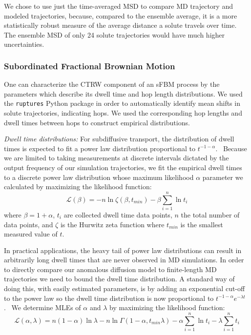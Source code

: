 \documentclass[aps,pre,preprint,groupedaddress,longbibliography]{revtex4-2}
\begin{document}
  We chose to use just the time-averaged MSD to compare MD trajectory and modeled
  trajectories, because, compared to the ensemble average, it is a more 
  statistically robust measure of the average distance a solute travels over time.
  The ensemble MSD of only 24 solute trajectories would have much higher uncertainties.
  
  \subsubsection{Subordinated Fractional Brownian Motion}\label{method:sfbm}

  One can characterize the CTRW component of an sFBM process by the parameters which describe
  its dwell time and hop length distributions. We used the \texttt{ruptures} Python
  package in order to automatically identify mean shifts in solute trajectories, 
  indicating hops.\cite{truong_ruptures:_2018} We used the corresponding hop lengths
  and dwell times between hops to construct empirical distributions.
  
  \textit{Dwell time distributions:} For subdiffusive transport, the distribution 
  of dwell times is expected to fit a power law distribution 
  proportional to $t^{-1-\alpha}$.~\cite{meroz_toolbox_2015}
  Because we are limited to taking measurements at discrete intervals dictated by the output 
  frequency of our simulation trajectories, we fit the empirical dwell times
  to a discrete power law distribution whose maximum likelihood $\alpha$ 
  parameter we calculated by maximizing the likelihood function: 
  \begin{equation}
	\mathcal{L}(\beta) = -n\ln \zeta(\beta, t_{min}) -
	\beta\sum_{i=1}^{n} \ln t_i 
  \label{eqn:powerlaw_likelihood}
  \end{equation}
  where $\beta = 1 + \alpha$, $t_i$ are collected dwell time data points,
  $n$ the total number of data points, and $\zeta$ is the Hurwitz zeta function
  where $t_{min}$ is the smallest measured value of	$t$.~\cite{clauset_power-law_2009}
  
  In practical applications, the heavy tail of power law distributions can result in 
  arbitrarily long dwell times that are never observed in MD simulations. 
  In order to directly compare our anomalous diffusion model to finite-length MD 
  trajectories we need to bound the dwell time distribution. A standard way of 
  doing this, with easily estimated parameters, is by adding an exponential 
  cut-off to the power law so the dwell time distribution is now proportional 
  to $t^{-1 - \alpha}e^{-\lambda t}$.~\cite{newman_power_2005,clauset_power-law_2009}  %
  We determine MLEs of $\alpha$ and $\lambda$ by maximizing the likelihood function:~\cite{clauset_power-law_2009}
  \begin{equation}
    \mathcal{L}(\alpha, \lambda) = n(1 - \alpha)\ln\lambda - n\ln\Gamma(1 - \alpha, t_{min}\lambda) - \alpha\sum_{i=1}^{n}\ln t_i - \lambda\sum_{i=1}^n t_i
  \label{eqn:powerlaw_cutoff_likelihood}
  \end{equation}
  
\end{document}
